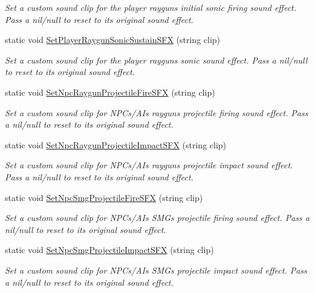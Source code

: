 \begin{DoxyCompactItemize}
\begin{DoxyCompactList}\small\item\em Set a custom sound clip for the player raygun\textquotesingle{}s initial sonic firing sound effect. Pass a nil/null to reset to its original sound effect. \end{DoxyCompactList}\item 
static void \mbox{\hyperlink{class_lua_1_1_custom_sound_manager_a09ff65bfa0a9c0144771c73edcc3643a}{Set\+Player\+Raygun\+Sonic\+Sustain\+S\+FX}} (string clip)
\begin{DoxyCompactList}\small\item\em Set a custom sound clip for the player raygun\textquotesingle{}s sonic sound effect. Pass a nil/null to reset to its original sound effect. \end{DoxyCompactList}\item 
static void \mbox{\hyperlink{class_lua_1_1_custom_sound_manager_a920b942d5d7751c3ff7676a48189c8ca}{Set\+Npc\+Raygun\+Projectile\+Fire\+S\+FX}} (string clip)
\begin{DoxyCompactList}\small\item\em Set a custom sound clip for N\+P\+Cs/\+A\+Is raygun\textquotesingle{}s projectile firing sound effect. Pass a nil/null to reset to its original sound effect. \end{DoxyCompactList}\item 
static void \mbox{\hyperlink{class_lua_1_1_custom_sound_manager_a5cf94ae4cc82a6ae9137b953c2b37b0f}{Set\+Npc\+Raygun\+Projectile\+Impact\+S\+FX}} (string clip)
\begin{DoxyCompactList}\small\item\em Set a custom sound clip for N\+P\+Cs/\+A\+Is raygun\textquotesingle{}s projectile impact sound effect. Pass a nil/null to reset to its original sound effect. \end{DoxyCompactList}\item 
static void \mbox{\hyperlink{class_lua_1_1_custom_sound_manager_a98258d37f9bfcd6d0ca5a53974629ab7}{Set\+Npc\+Smg\+Projectile\+Fire\+S\+FX}} (string clip)
\begin{DoxyCompactList}\small\item\em Set a custom sound clip for N\+P\+Cs/\+A\+Is S\+MG\textquotesingle{}s projectile firing sound effect. Pass a nil/null to reset to its original sound effect. \end{DoxyCompactList}\item 
static void \mbox{\hyperlink{class_lua_1_1_custom_sound_manager_ac2be140403d813db6f58549e8e1ec024}{Set\+Npc\+Smg\+Projectile\+Impact\+S\+FX}} (string clip)
\begin{DoxyCompactList}\small\item\em Set a custom sound clip for N\+P\+Cs/\+A\+Is S\+MG\textquotesingle{}s projectile impact sound effect. Pass a nil/null to reset to its original sound effect. \end{DoxyCompactList}\end{DoxyCompactItemize}


